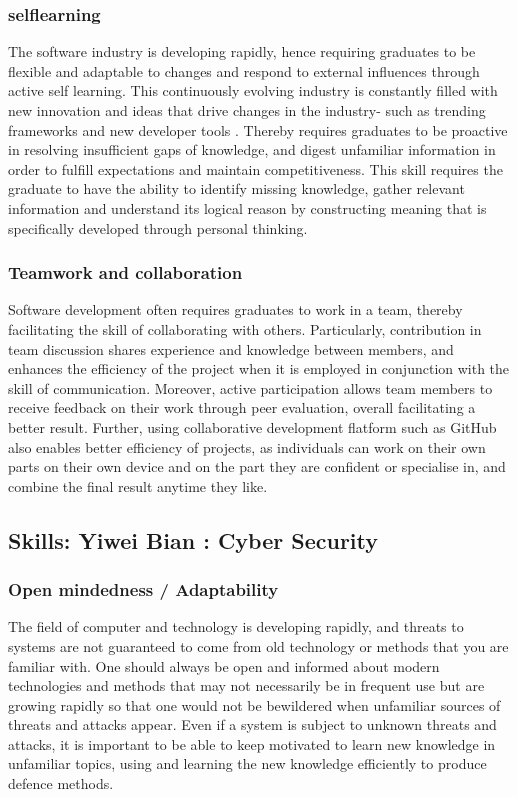 \documentclass[a4paper, 11pt]{report}
\begin{document}
\subsubsection{selflearning}
The software industry is developing rapidly, hence requiring graduates to be flexible and adaptable to changes and respond to external influences through active self learning. This continuously evolving industry is constantly filled with new innovation and ideas that drive changes in the industry- such as trending frameworks and new developer tools . Thereby requires graduates to be proactive in resolving insufficient gaps of knowledge, and digest unfamiliar information in order to fulfill expectations and maintain competitiveness. This skill requires the graduate to have the ability to identify missing knowledge, gather relevant information and understand its logical reason by constructing meaning that is specifically developed through personal thinking.

\subsubsection{Teamwork and collaboration}
Software development often requires graduates to work in a team, thereby facilitating the skill of collaborating with others. Particularly, contribution in team discussion shares experience and knowledge between members, and enhances the efficiency of the project when it is employed in conjunction with the skill of communication. Moreover, active participation allows team members to receive feedback on their work through peer evaluation, overall facilitating a better result. Further, using collaborative development flatform such as GitHub also enables better efficiency of projects, as individuals can work on their own parts on their own device and on the part they are confident or specialise in, and combine the final result anytime they like.


\subsection{Skills: Yiwei Bian : Cyber Security}
\subsubsection{Open mindedness / Adaptability}
The field of computer and technology is developing rapidly, and threats to systems are not guaranteed to come from old technology or methods that you are familiar with. One should always be open and informed about modern technologies and methods that may not necessarily be in frequent use but are growing rapidly so that one would not be bewildered when unfamiliar sources of threats and attacks appear. Even if a system is subject to unknown threats and attacks, it is important to be able to keep motivated to learn new knowledge in unfamiliar topics, using and learning the new knowledge efficiently to produce defence methods.
\end{document}
